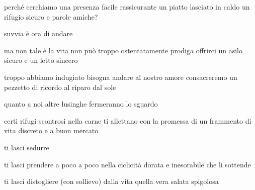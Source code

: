 \clearpage


\begin{poem}
	\begin{stanza}
                perché cerchiamo una presenza facile\verseline
                rassicurante\verseline
                un piatto lasciato in caldo\verseline
                un rifugio sicuro e parole amiche?
	\end{stanza}

	\begin{stanza}
                suvvia\verseline
                è ora di andare
	\end{stanza}

	\begin{stanza}
                ma non tale è la vita non può\verseline
                troppo ostentatamente prodiga\verseline
                offrirci un asilo sicuro e un letto sincero
	\end{stanza}

	\begin{stanza}
                troppo abbiamo indugiato\verseline
                bisogna andare\verseline
                al nostro amore consacreremo un pezzetto di ricordo\verseline
                al riparo dal sole
	\end{stanza}

	\begin{stanza}
                quanto a noi\verseline
                altre lusinghe fermeranno lo sguardo
	\end{stanza}
\end{poem}

\clearpage


\begin{poem}
	\begin{stanza}
                certi rifugi scontrosi nella carne\verseline
                ti allettano con la promessa di un frammento\verseline
                di vita discreto e a buon mercato
	\end{stanza}

	\begin{stanza}
                ti lasci sedurre
	\end{stanza}

	\begin{stanza}
                ti lasci prendere a poco a poco\verseline
                nella ciclicità dorata e inesorabile\verseline
                che li sottende
	\end{stanza}

	\begin{stanza}
                ti lasci distogliere\verseline
                (con sollievo)\verseline
                dalla vita\verseline
                quella vera\verseline
                salata\verseline
                spigolosa
	\end{stanza}
\end{poem}

